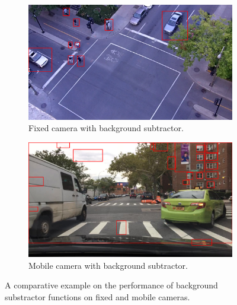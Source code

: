 \begin{figure}
    \centering
    \begin{subfigure}[t]{0.47\linewidth}
        \centering
        \includegraphics[width=\linewidth]{chapters/videojam/images/fixed_camera_bg_subtractor1003.png}
        \caption{Fixed camera with background subtractor.}
        \label{fig:fixed}
    \end{subfigure}
    \hfill
    \begin{subfigure}[t]{0.47\linewidth}
        \centering
        \includegraphics[width=\linewidth]{chapters/videojam/images/mobile_camera_bg_subtractor.png}
        \caption{Mobile camera with background subtractor.}
        \label{fig:mobile}
    \end{subfigure}
    \caption{A comparative example on the performance of background substractor functions on fixed and mobile cameras.}
    \label{fig:backgroung_subtractor}
\end{figure}


